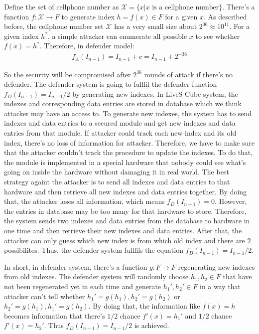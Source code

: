 \documentclass[10pt,a4paper]{article}
\begin{document}
		Define the set of cellphone number as $\mathcal X = \{x | \text{$x$ is a cellphone number}\}$.
		There's a function $f: \mathcal X \rightarrow F$ to generate index $h = f(x) \in F$ for
		a given $x$. As described before, the cellphone number set $\mathcal X$ has a very small
		size about $2^{36} \approx 10^{11}$. For a given index $h^*$, a simple attacker
		can enumerate all possible $x$ to see whether $f(x) = h^*$. Therefore, in defender
		model:
		\begin{align*}
			f_A(I_{n-1}) = I_{n-1}+c = I_{n-1}+2^{-36}
		\end{align*}
		
		So the security will be compromised after $2^{36}$ rounds of attack if there's
		no defender. The defender system is going to fullfil the defender
		function $f_D(I_{n-1}) = I_{n-1}/2$ by generating new indexes.
		In LiveS Cube system, the indexes and corresponding data entries are stored
		in database which we think attacker may have an access to. To generate
		new indexes, the system has to send indexes and data entries to a 
		secured module
		and get new indexes and data entries from that module. If attacker
		could track each new index and its old index, there's no loss of information 
		for attacker. Therefore, we have to make sure that the attacker couldn't track
		the procedure to update the indexes.
		To do that, the module is implemented in a special hardware that nobody
		could see what's going on inside the hardware without damaging it in real world.
		The best strategy againt the attacker 
		is to send all indexes and data entries to that hardware and then
		retrieve all new indexes and data entries together. By doing that, the attacker
		loses all information, which means $f_D(I_{n-1}) = 0$. However, the entries
		in database may be too many for that hardware to store. Therefore, the system
		sends two indexes and data entries from the database to hardware in one time and
		then retrieve their new indexes and data entries. After that, the attacker can
		only guess which new index is from which old index and there are $2$ possibilites.
		Thus, the defender system fullfils the equation $f_D(I_{n-1}) = I_{n-1}/2$.
		
		In short, in defender system,
		there's a function $g: F \rightarrow F$ regenerating 
		new indexes from old indexes. The defender system
		will randomly choose $h_1, h_2 \in F$ that have
		not been regenerated yet in each time and generate
		$h_1', h_2' \in F$ in a way that attacker can't tell whether
		$h_1' = g(h_1), h_2' = g(h_2)$ or $h_2' = g(h_1), h_1' = g(h_2)$.
		By doing that, the information like $f(x) = h$ becomes
		information that there's $1/2$ chance $f'(x) = h_1'$ and $1/2$ chance $f'(x) = h_2'$.
		Thus $f_D(I_{n-1}) = I_{n-1}/2$ is achieved.
		
\end{document}
